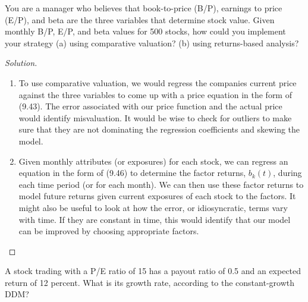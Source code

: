 \begin{problem}{9.4}
  You are a manager who believes that book-to-price (B/P), earnings to price (E/P), and beta are the three variables that determine stock value. Given monthly B/P, E/P, and beta values for 500 stocks, how could you implement your strategy (a) using comparative valuation? (b) using returns-based analysis?
\end{problem}

\begin{proof}[Solution]
  \quad\\
  \begin{enumerate}[label=(\alph*)]
   \item{To use comparative valuation, we would regress the companies current price against the three variables to come up with a price equation in the form of (9.43). The error associated with our price function and the actual price would identify misvaluation. It would be wise to check for outliers to make sure that they are not dominating the regression coefficients and skewing the model.}
   \item{Given monthly attributes (or exposures) for each stock, we can regress an equation in the form of (9.46) to determine the factor returns, $b_{k}(t)$, during each time period (or for each month). We can then use these factor returns to model future returns given current exposures of each stock to the factors. It might also be useful to look at how the error, or idiosyncratic, terms vary with time. If they are constant in time, this would identify that our model can be improved by choosing appropriate factors.}
  \end{enumerate}

 
\end{proof}

\begin{problem}{9.5}
  A stock trading with a P/E ratio of 15 has a payout ratio of 0.5 and an expected return of 12 percent. What is its growth rate, according to the constant-growth DDM?
\end{problem}

